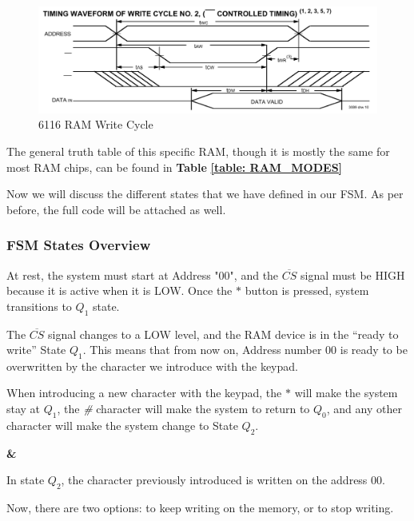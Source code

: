 \begin{figure}[H]
    \centering
    \includegraphics[scale = 0.60]{Graphics/RAM/6116.pdf}
    \caption{6116 RAM Write Cycle}
    \label{fig:6116}
\end{figure}


The general truth table of this specific RAM, though it is mostly the same for most RAM chips, can be found in \textbf{Table} \textbf{\ref{table: RAM_MODES}} \medskip

Now we will discuss the different states that we have defined in our FSM. As per before, the full code will be attached as well.

\subsubsection{FSM States Overview}

    \hspace{0.4cm}
\medskip

At rest, the system must start at Address "00", and the $\overline{CS}$ signal must be HIGH because it is active when it is LOW. Once the $*$ button is pressed, system transitions to $Q_1$ state.

\medskip
\medskip

The $\overline{CS}$ signal changes to a LOW level, and the RAM device is in the “ready to write” State $Q_1$. This means that from now on, Address number $00$ is ready to be overwritten by the character we introduce with the keypad. 

\medskip
When introducing a new character with the keypad, the $*$ will make the system stay at $Q_1$,  the \textit{\#} character will make the system to return to $Q_0$, and any other character will make the system change to State $Q_2$. \medskip

 \textbf{\&} \medskip

In state $Q_2$, the character previously introduced is written on the address $00$.

\medskip
Now, there are two options: to keep writing on the memory, or to stop writing.


